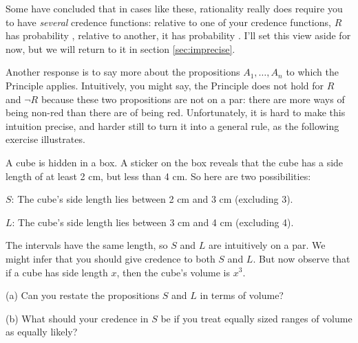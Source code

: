 Some have concluded that in cases like these, rationality really does
require you to have \emph{several} credence functions: relative to one
of your credence functions, $R$ has probability ,
relative to another, it has probability . I'll set
this view aside for now, but we will return to it in section
\ref{sec:imprecise}.

Another response is to say more about the propositions
$A_1,\ldots,A_n$ to which the Principle applies. Intuitively, you
might say, the Principle does not hold for $R$ and $\neg R$ because
these two propositions are not on a par: there are more ways of being
non-red than there are of being red. Unfortunately, it is hard to make this
intuition precise, and harder still to turn it into a general rule, as
the following exercise illustrates.

\begin{exercise2}\label{e:cubefactory}
  A cube is hidden in a box. A sticker on the box reveals that the cube
  has a side length of at least 2 cm, but less than 4 cm. So here are
  two possibilities:
  \begin{enumerate*}
  \item[$S$:] The cube's side length lies between 2 cm and 3 cm (excluding 3).
  \item[$L$:] The cube's side length lies between 3 cm and 4 cm (excluding 4).
  \end{enumerate*}
  The intervals have the same length, so $S$ and $L$ are intuitively
  on a par. We might infer that you should give credence
   to both $S$ and $L$. But now observe that if a cube
  has side length $x$, then the cube's volume is $x^3$.
  \begin{enumerate*}
  \item[(a)] Can you restate the propositions $S$ and $L$ in terms of
    volume?
  \item[(b)] What should your credence in $S$ be if you treat equally
    sized ranges of volume as equally likely?
  \end{enumerate*}
  \vspace{-5mm}
\end{exercise2}


